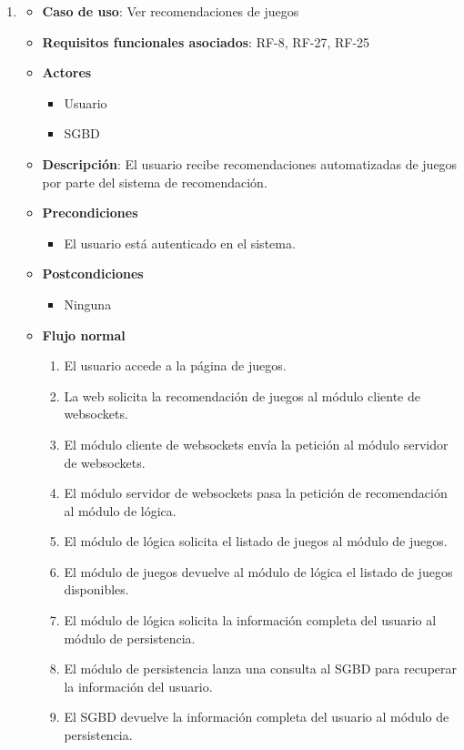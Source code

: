 \begin{enumerate}
\item %
  \begin{itemize}
  \item \textbf{Caso de uso}: Ver recomendaciones de juegos
  \item \textbf{Requisitos funcionales asociados}: RF-8, RF-27, RF-25
  \item \textbf{Actores}
    \begin{itemize}
    \item Usuario
    \item SGBD
    \end{itemize}
  \item \textbf{Descripción}: El usuario recibe recomendaciones automatizadas de juegos por parte del sistema de recomendación.
  \item \textbf{Precondiciones}
    \begin{itemize}
    \item El usuario está autenticado en el sistema.
    \end{itemize}
  \item \textbf{Postcondiciones}
    \begin{itemize}
    \item Ninguna
    \end{itemize}
  \item \textbf{Flujo normal}
    \begin{enumerate}
    \item El usuario accede a la página de juegos.
    \item La web solicita la recomendación de juegos al módulo cliente de websockets.
    \item El módulo cliente de websockets envía la petición al módulo servidor de websockets.
    \item El módulo servidor de websockets pasa la petición de recomendación al módulo de lógica.
    \item El módulo de lógica solicita el listado de juegos al módulo de juegos.
    \item El módulo de juegos devuelve al módulo de lógica el listado de juegos disponibles.
    \item El módulo de lógica solicita la información completa del usuario al módulo de persistencia.
    \item El módulo de persistencia lanza una consulta al SGBD para recuperar la información del usuario.
    \item El SGBD devuelve la información completa del usuario al módulo de persistencia.

\end{enumerate}
\end{itemize}
\end{enumerate}
